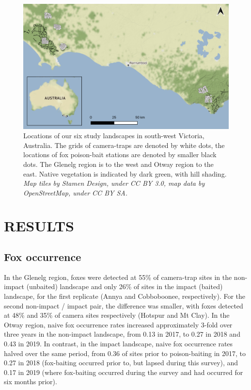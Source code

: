 \documentclass[]{elsarticle} %
\begin{document}
\newpage

\begin{figure}
\includegraphics[width=1\linewidth]{figs/fig1} \caption{Locations of our six study landscapes in south-west Victoria, Australia. The grids of camera-traps are denoted by white dots, the locations of fox poison-bait stations are denoted by smaller black dots. The Glenelg region is to the west and Otway region to the east. Native vegetation is indicated by dark green, with hill shading. \textit{Map tiles by Stamen Design, under CC BY 3.0, map data by OpenStreetMap, under CC BY SA.}}\label{fig:map}
\end{figure}

\newpage

\hypertarget{results}{%
\section{RESULTS}\label{results}}

\hypertarget{fox-occurrence}{%
\subsection{Fox occurrence}\label{fox-occurrence}}

In the Glenelg region, foxes were detected at 55\% of camera-trap sites in the non-impact (unbaited) landscape and only 26\% of sites in the impact (baited) landscape, for the first replicate (Annya and Cobboboonee, respectively). For the second non-impact / impact pair, the difference was smaller, with foxes detected at 48\% and 35\% of camera sites respectively (Hotspur and Mt Clay). In the Otway region, naive fox occurrence rates increased approximately 3-fold over three years in the non-impact landscape, from 0.13 in 2017, to 0.27 in 2018 and 0.43 in 2019. In contrast, in the impact landscape, naive fox occurrence rates halved over the same period, from 0.36 of sites prior to poison-baiting in 2017, to 0.27 in 2018 (fox-baiting occurred prior to, but lapsed during this survey), and 0.17 in 2019 (where fox-baiting occurred during the survey and had occurred for six months prior).
\end{document}
